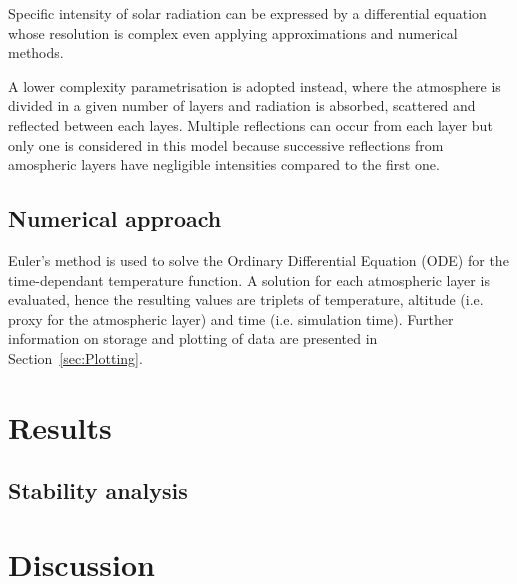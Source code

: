 \documentclass[a4paper,10pt,draft,twocolumn]{article}
\begin{document}
Specific intensity of solar radiation can be expressed by a differential equation whose resolution is complex even applying approximations and numerical methods.\cite[469]{ramanathan}

A lower complexity parametrisation is adopted instead, where the atmosphere is divided in a given number of layers and radiation is absorbed, scattered and reflected between each layes. Multiple reflections can occur from each layer but only one is considered in this model because successive reflections from amospheric layers have negligible intensities compared to the first one.\cite[470]{ramanathan}


\subsection{Numerical approach} %
Euler's method is used to solve the Ordinary Differential Equation (ODE) for the time-dependant temperature function.\cite[472]{ramanathan} A solution for each atmospheric layer is evaluated, hence the resulting values are triplets of temperature, altitude (i.e. proxy for the atmospheric layer) and time (i.e. simulation time). Further information on storage and plotting of data are presented in Section~\ref{sec:Plotting}.

\section{Results}

\subsection{Stability analysis}

\section{Discussion}
\end{document}
